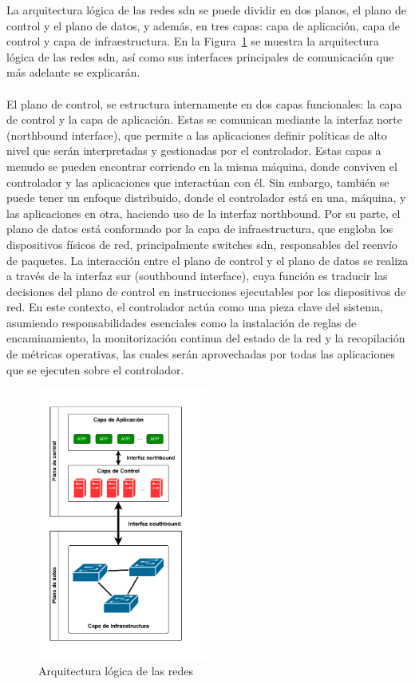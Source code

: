 La arquitectura lógica de las redes \gls{sdn} se puede dividir en dos planos, el plano de control y el plano de datos, y además, en tres capas: capa de aplicación, capa de control y capa de infraestructura. En la Figura~\ref{fig:sdn_architecture} se muestra la arquitectura lógica de las redes \gls{sdn}, así como sus interfaces principales de comunicación que más adelante se explicarán.\\
\\
El plano de control, se estructura internamente en dos capas funcionales: la capa de control y la capa de aplicación. Estas se comunican mediante la interfaz norte (northbound interface), que permite a las aplicaciones definir políticas de alto nivel que serán interpretadas y gestionadas por el controlador. Estas capas a menudo se pueden encontrar corriendo en la misma máquina, donde conviven el controlador y las aplicaciones que interactúan con él. Sin embargo, también se puede tener un enfoque distribuido, donde el controlador está en una, máquina, y las aplicaciones en otra, haciendo uso de la interfaz northbound. Por su parte, el plano de datos está conformado por la capa de infraestructura, que engloba los dispositivos físicos de red, principalmente switches \gls{sdn}, responsables del reenvío de paquetes. La interacción entre el plano de control y el plano de datos se realiza a través de la interfaz sur (southbound interface), cuya función es traducir las decisiones del plano de control en instrucciones ejecutables por los dispositivos de red. En este contexto, el controlador actúa como una pieza clave del sistema, asumiendo responsabilidades esenciales como la instalación de reglas de encaminamiento, la monitorización continua del estado de la red y la recopilación de métricas operativas, las cuales serán aprovechadas por todas las aplicaciones que se ejecuten sobre el controlador.

\begin{figure}[ht!]
\centering
\includegraphics[width=0.5\textwidth]{fig/02_sota/sota_2_sdn_arch_b.drawio.pdf}
\caption{Arquitectura lógica de las redes }
\label{fig:sdn_architecture}
\end{figure}

